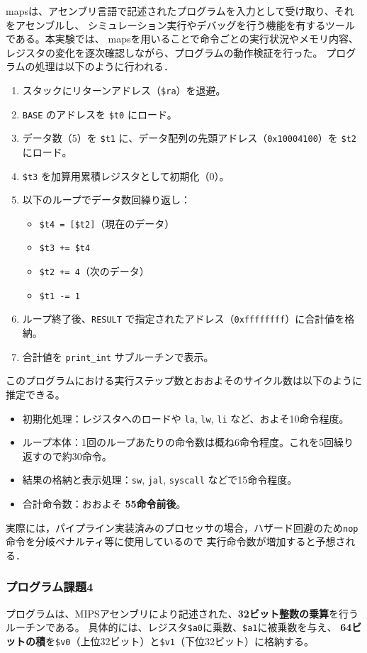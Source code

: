 \documentclass[autodetect-engine,dvi=dvipdfmx,ja=standard,
               a4j,11pt]{bxjsarticle}
\begin{document}
mapsは、アセンブリ言語で記述されたプログラムを入力として受け取り、それをアセンブルし、
シミュレーション実行やデバッグを行う機能を有するツールである。本実験では、
mapsを用いることで命令ごとの実行状況やメモリ内容、レジスタの変化を逐次確認しながら、プログラムの動作検証を行った。
プログラムの処理は以下のように行われる．
\begin{enumerate}
  \item スタックにリターンアドレス（\texttt{\$ra}）を退避。
  \item \texttt{BASE} のアドレスを \texttt{\$t0} にロード。
  \item データ数（5）を \texttt{\$t1} に、データ配列の先頭アドレス（\texttt{0x10004100}）を \texttt{\$t2} にロード。
  \item \texttt{\$t3} を加算用累積レジスタとして初期化（0）。
  \item 以下のループでデータ数回繰り返し：
  \begin{itemize}
    \item \texttt{\$t4 = [\$t2]}（現在のデータ）
    \item \texttt{\$t3 += \$t4}
    \item \texttt{\$t2 += 4}（次のデータ）
    \item \texttt{\$t1 -= 1}
  \end{itemize}
  \item ループ終了後、\texttt{RESULT} で指定されたアドレス（\texttt{0xffffffff}）に合計値を格納。
  \item 合計値を \texttt{print\_int} サブルーチンで表示。
\end{enumerate}
このプログラムにおける実行ステップ数とおおよそのサイクル数は以下のように推定できる。

\begin{itemize}
  \item 初期化処理：レジスタへのロードや \texttt{la}, \texttt{lw}, \texttt{li} など、およそ10命令程度。
  \item ループ本体：1回のループあたりの命令数は概ね6命令程度。これを5回繰り返すので約30命令。
  \item 結果の格納と表示処理：\texttt{sw}, \texttt{jal}, \texttt{syscall} などで15命令程度。
  \item 合計命令数：おおよそ \textbf{55命令前後}。
\end{itemize}
実際には，パイプライン実装済みのプロセッサの場合，ハザード回避のため\verb|nop|命令を分岐ペナルティ等に使用しているので
実行命令数が増加すると予想される．
\subsubsection*{プログラム課題4}
プログラムは、MIPSアセンブリにより記述された、\textbf{32ビット整数の乗算}を行うルーチンである。
具体的には、レジスタ\verb|$a0|に乗数、\verb|$a1|に被乗数を与え、
\textbf{64ビットの積}を\verb|$v0|（上位32ビット）と\verb|$v1|（下位32ビット）に格納する。
\end{document}
